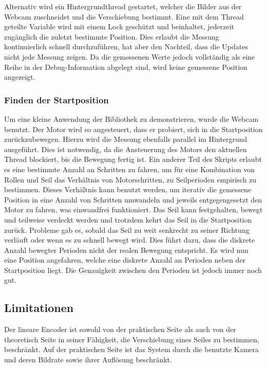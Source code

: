 \documentclass[10pt,a4paper]{scrarticle}
\begin{document}
	Alternativ wird ein Hintergrundthread gestartet, welcher die Bilder aus der Webcam zuschneidet und die Verschiebung bestimmt. Eine mit dem Thread geteilte Variable wird mit einem Lock geschützt und beinhaltet, jederzeit zugänglich die zuletzt bestimmte Position. Dies erlaubt die Messung kontinuierlich schnell durchzuführen, hat aber den Nachteil, dass die Updates nicht jede Messung zeigen. Da die gemessenen Werte jedoch vollständig als eine Reihe in der Debug-Information abgelegt sind, wird keine gemessene Position angezeigt.
	\subsubsection{Finden der Startposition}
	Um eine kleine Anwendung der Bibliothek zu demonstrieren, wurde die Webcam benutzt. Der Motor wird so angesteuert, dass er probiert, sich in die Startposition zurückzubewegen. Hierzu wird die Messung ebenfalls parallel im Hintergrund ausgeführt. Dies ist notwendig, da die Ansteuerung des Motors den aktuellen Thread blockiert, bis die Bewegung fertig ist. 
	Ein anderer Teil des Skripts erlaubt es eine bestimmte Anzahl an Schritten zu fahren, um für eine Kombination von Rollen und Seil das Verhältnis von Motorschritten, zu Seilperioden empirisch zu bestimmen. Dieses Verhältnis kann benutzt werden, um iterativ die gemessene Position in eine Anzahl von Schritten umwandeln und jeweils entgegengesetzt den Motor zu fahren, was einwandfrei funktioniert. Das Seil kann festgehalten, bewegt und teilweise verdeckt werden und trotzdem kehrt das Seil in die Startposition zurück. Probleme gab es, sobald das Seil zu weit senkrecht zu seiner Richtung verläuft oder wenn es zu schnell bewegt wird. Dies führt dazu, dass die diskrete Anzahl bewegter Perioden nicht der realen Bewegung entspricht. Es wird nun eine Position angefahren, welche eine diskrete Anzahl an Perioden neben der Startposition liegt. Die Genauigkeit zwischen den Perioden ist jedoch immer noch gut.
	
    \subsection{Limitationen}
    Der lineare Encoder ist sowohl von der praktischen Seite als auch von der theoretisch Seite in seiner Fähigkeit, die Verschiebung eines Seiles zu bestimmen, beschränkt. Auf der praktischen Seite ist das System durch die benutzte Kamera und deren Bildrate sowie ihrer Auflösung beschränkt.\\
    
\end{document}
